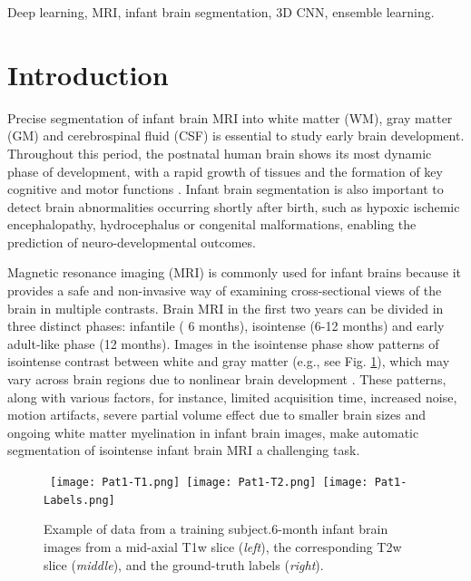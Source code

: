 \documentclass[twoside,espcrc2]{elsarticle}
\begin{document}
\begin{frontmatter}
\begin{abstract}
\end{abstract}

\begin{keyword}
Deep learning, MRI, infant brain segmentation, 3D CNN, ensemble learning.
\end{keyword}

\end{frontmatter}






\section{Introduction}

Precise segmentation of infant brain MRI into white matter (WM), gray matter (GM) and cerebrospinal fluid (CSF) is essential to study early brain development. Throughout this period, the postnatal human brain shows its most dynamic phase of development, with a rapid growth of tissues and the formation of key cognitive and motor functions \cite{paus2001maturation}. Infant brain segmentation is also important to detect brain abnormalities occurring shortly after birth, such as hypoxic ischemic encephalopathy, hydrocephalus or congenital malformations, enabling the prediction of neuro-developmental outcomes. 

Magnetic resonance imaging (MRI) is commonly used for infant brains because it provides a safe and non-invasive way of examining cross-sectional views of the brain in multiple contrasts. Brain MRI in the first two years can be divided in three distinct phases: infantile ( 6 months), isointense (6-12 months) and early adult-like phase (12 months). Images in the isointense phase show patterns of isointense contrast between white and gray matter (e.g., see Fig. \ref{fig:isointense}), which may vary across brain regions due to nonlinear brain development \cite{paus2001maturation}. These patterns, along with various factors, for instance, limited acquisition time, increased noise, motion artifacts, severe partial volume effect due to smaller brain sizes and ongoing white matter myelination in infant brain images, make automatic segmentation of isointense infant brain MRI a challenging task. 

\begin{figure}[ht!]
\begin{center}
     \mbox{
        \texttt{[image: Pat1-T1.png]}
        \hspace{-2.5 mm}
        \texttt{[image: Pat1-T2.png]}
        \hspace{-2.5 mm}
        \texttt{[image: Pat1-Labels.png]}
        }
\caption{Example of data from a training subject.6-month infant brain images from a mid-axial T1w slice (\textit{left}), the corresponding T2w slice (\textit{middle}), and the ground-truth labels (\textit{right}).}
\label{fig:isointense}
\end{center}
\end{figure}
\end{document}
